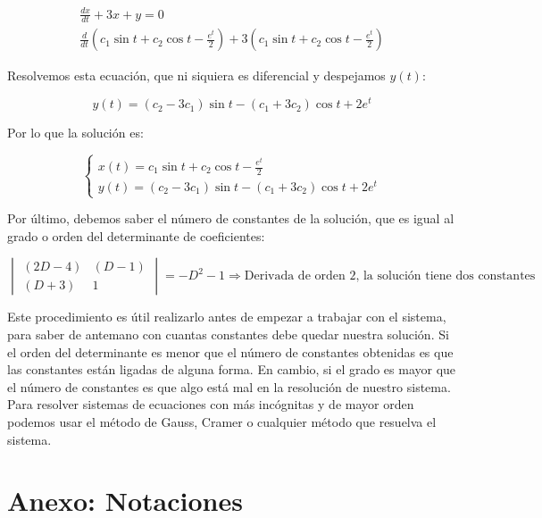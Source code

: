 \documentclass[a4paper,12pt,titlepage]{article}
\begin{document}
\begin{equation}
    \begin{gathered}
        \frac{dx}{dt} + 3x + y =0  \\
        \frac{d}{dt}(c_1 \sin t + c_2 \cos t - \frac{e^t}{2})+ 3(c_1 \sin t + c_2 \cos t - \frac{e^t}{2})
    \end{gathered}
\end{equation}

Resolvemos esta ecuación, que ni siquiera es diferencial y despejamos $y(t)$:

\begin{equation}
    y(t) = (c_2 - 3c_1)\sin t - (c_1+3c_2)\cos t +2e^t
\end{equation}

Por lo que la solución es:

\begin{equation}
    \left\{ \begin{array}{l}
        x(t) = c_1 \sin t + c_2 \cos t - \frac{e^t}{2} \\
        y(t) = (c_2 - 3c_1)\sin t - (c_1+3c_2)\cos t +2e^t
    \end{array}
    \right.
\end{equation}

Por último, debemos saber el número de constantes de la solución, que es igual al grado o orden del determinante de coeficientes:

\begin{equation}
    \begin{vmatrix}
        (2D - 4 ) & (D-1) \\
        (D+3) & 1
    \end{vmatrix} = -D^2 - 1 \Rightarrow \text{Derivada de orden 2, la solución tiene dos constantes}
\end{equation}

Este procedimiento es útil realizarlo antes de empezar a trabajar con el sistema, para saber de antemano con cuantas constantes debe quedar nuestra solución. Si el orden del determinante es menor que el número de constantes obtenidas es que las constantes están ligadas de alguna forma. En cambio, si el grado es mayor que el número de constantes es que algo está mal en la resolución de nuestro sistema. Para resolver sistemas de ecuaciones con más incógnitas y de mayor orden podemos usar el método de Gauss, Cramer o cualquier método que resuelva el sistema.

\section{Anexo: Notaciones}
\end{document}
